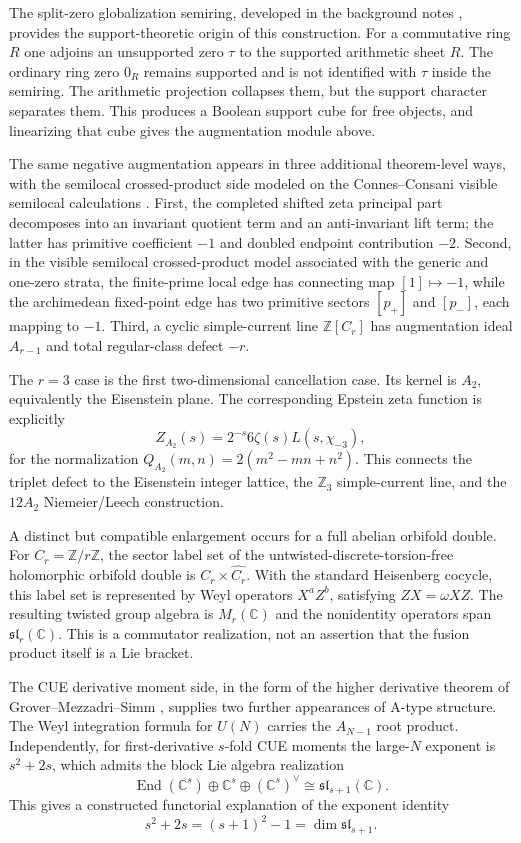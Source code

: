 \documentclass[11pt]{amsart}
\DeclareMathOperator{\End}{End}
\newcommand{\ZZ}{\mathbb Z}
\newcommand{\CC}{\mathbb C}
\newcommand{\tauz}{\tau}
\begin{document}
The split-zero globalization semiring, developed in the background notes \cite{splitzero,globalization}, provides the support-theoretic origin of this construction.  For a commutative ring $R$ one adjoins an unsupported zero $\tauz$ to the supported arithmetic sheet $R$.  The ordinary ring zero $0_R$ remains supported and is not identified with $\tauz$ inside the semiring.  The arithmetic projection collapses them, but the support character separates them.  This produces a Boolean support cube for free objects, and linearizing that cube gives the augmentation module above.

The same negative augmentation appears in three additional theorem-level ways, with the semilocal crossed-product side modeled on the Connes--Consani visible semilocal calculations \cite{connesconsani,connesconsanicft}.  First, the completed shifted zeta principal part decomposes into an invariant quotient term and an anti-invariant lift term; the latter has primitive coefficient $-1$ and doubled endpoint contribution $-2$.  Second, in the visible semilocal crossed-product model associated with the generic and one-zero strata, the finite-prime local edge has connecting map $[1]\mapsto -1$, while the archimedean fixed-point edge has two primitive sectors $[p_+]$ and $[p_-]$, each mapping to $-1$.  Third, a cyclic simple-current line $\ZZ[C_r]$ has augmentation ideal $A_{r-1}$ and total regular-class defect $-r$.

The $r=3$ case is the first two-dimensional cancellation case.  Its kernel is $A_2$, equivalently the Eisenstein plane.  The corresponding Epstein zeta function is explicitly
\[
       Z_{A_2}(s)=2^{-s}6\zeta(s)L(s,\chi_{-3}),
\]
for the normalization $Q_{A_2}(m,n)=2(m^2-mn+n^2)$.  This connects the triplet defect to the Eisenstein integer lattice, the $\ZZ_3$ simple-current line, and the $12A_2$ Niemeier/Leech construction.

A distinct but compatible enlargement occurs for a full abelian orbifold double.  For $C_r=\ZZ/r\ZZ$, the sector label set of the untwisted-discrete-torsion-free holomorphic orbifold double is $C_r\times\widehat{C_r}$.  With the standard Heisenberg cocycle, this label set is represented by Weyl operators $X^aZ^b$, satisfying $ZX=\omega XZ$.  The resulting twisted group algebra is $M_r(\CC)$ and the nonidentity operators span $\mathfrak{sl}_r(\CC)$.  This is a commutator realization, not an assertion that the fusion product itself is a Lie bracket.

The CUE derivative moment side, in the form of the higher derivative theorem of Grover--Mezzadri--Simm \cite{cue}, supplies two further appearances of A-type structure.  The Weyl integration formula for $U(N)$ carries the $A_{N-1}$ root product.  Independently, for first-derivative $s$-fold CUE moments the large-$N$ exponent is $s^2+2s$, which admits the block Lie algebra realization
\[
       \End(\CC^s)\oplus \CC^s\oplus (\CC^s)^\vee
       \cong \mathfrak{sl}_{s+1}(\CC).
\]
This gives a constructed functorial explanation of the exponent identity
\[
       s^2+2s=(s+1)^2-1=\dim\mathfrak{sl}_{s+1}.
\]
\end{document}
